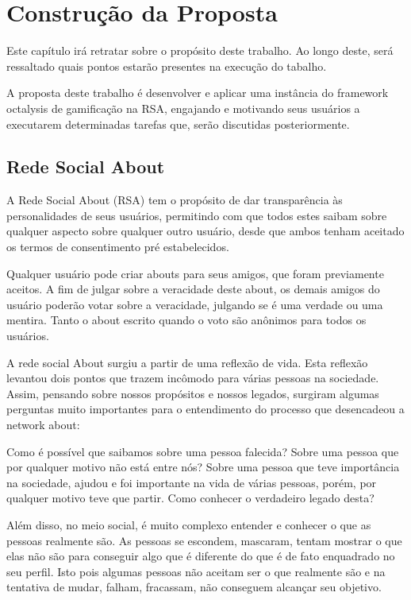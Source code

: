 \chapter[Construção da Proposta]{Construção da Proposta}

Este capítulo irá retratar sobre o propósito deste trabalho. Ao longo deste, será ressaltado quais
pontos estarão presentes na execução do tabalho.

A proposta deste trabalho é desenvolver e aplicar uma instância do framework octalysis de gamificação na RSA, engajando e
motivando seus usuários a executarem determinadas tarefas que, serão discutidas posteriormente.


\section{Rede Social About}
\label{sub:redesocialabout}
A Rede Social About (RSA) tem o propósito de dar transparência às personalidades de seus usuários, permitindo com que todos
estes saibam sobre qualquer aspecto sobre qualquer outro usuário, desde que ambos tenham aceitado os
termos de consentimento pré estabelecidos.

Qualquer usuário pode criar abouts para seus amigos, que foram previamente aceitos. A fim de julgar
sobre a veracidade deste about, os demais amigos do usuário poderão votar sobre a veracidade,
julgando se é uma verdade ou uma mentira. Tanto o about escrito quando o voto são anônimos para todos os
usuários.

A rede social About surgiu a partir de uma reflexão de vida. Esta reflexão
levantou dois pontos que trazem incômodo para várias pessoas na sociedade.
Assim, pensando sobre
nossos propósitos e nossos legados, surgiram algumas perguntas muito importantes
para o entendimento do processo que desencadeou a network about:

Como é possível que saibamos sobre uma pessoa falecida? Sobre uma pessoa que por 
qualquer motivo não está entre nós? Sobre uma pessoa que teve importância na 
sociedade, ajudou e foi importante na vida de várias pessoas, porém, por 
qualquer motivo teve que partir. Como conhecer o verdadeiro legado desta?

Além disso, no meio social, é muito complexo entender e conhecer o que as 
pessoas
realmente são. As pessoas se escondem, mascaram, tentam mostrar o que elas não
são para conseguir algo que é diferente do que é de fato enquadrado no seu
perfil. Isto pois algumas pessoas não aceitam ser o que realmente são e na
tentativa de mudar, falham, fracassam, não conseguem alcançar seu objetivo.


